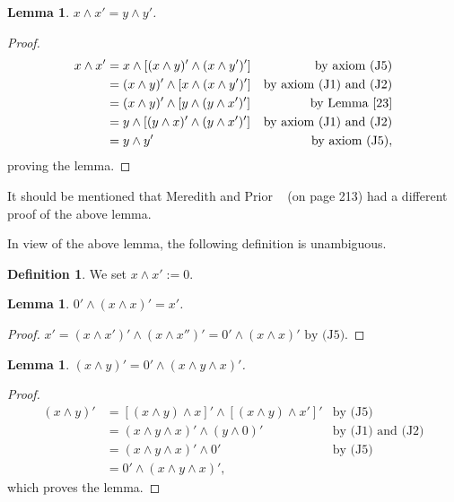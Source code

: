 \documentclass{amsart}
\theoremstyle{plain}
\newtheorem{lemma}[theorem]{Lemma}
\theoremstyle{problem}
\theoremstyle{definition}
\newtheorem{definition}[theorem]{Definition}
\theoremstyle{remark}
\numberwithin{equation}{section}
\begin{document}
\begin{lemma} \label{24} 
    $x \land x' = y \land y'$.
\end{lemma}
\begin{proof}
\begin{align*}
               x \land x' 
               &= x \land [(x \land y)' \land (x \land y')']  &\text{by axiom (J5)}\\
              &= (x \land y)' \land [x \land (x \land y')'] &\text{by axiom (J1) and (J2)}\\
             &= (x \land y)' \land  [y \land (y \land x')'] &\text{by Lemma \ref{23}}\\
            &= y \land [(y \land x)' \land (y \land x')'] &\text{by axiom (J1) and (J2)}\\
           &= y \land y' &\text{by axiom (J5)},
\end{align*}
proving the lemma.
\end{proof}

    It should be mentioned that Meredith and Prior ~\cite{cM68} (on page 213) had a different proof of the above lemma.


In view of the above lemma, the following definition is unambiguous.
\begin{definition} \label{25} 
    We set $x \land x' := 0$.
\end{definition}


\begin{lemma} \label{28} 
    $0' \land (x \land x)'=x'$.
\end{lemma}
\begin{proof}
  $x' = (x \land x')' \land (x \land x'')'= 0' \land (x \land x)' \text{ by (J5)}$.
\end{proof}


\begin{lemma} \label{210} 
    $(x \land y)' = 0' \land (x \land y \land x)'$.
\end{lemma}
\begin{proof}
\begin{align*}
    (x \land y)' &= [(x \land y) \land x]' \land [(x \land y) \land x']' &\text{by (J5)}\\
                 &= (x \land y \land x)' \land (y \land 0)'  &\text{by (J1) and (J2)}\\         
                 &= (x \land y \land x)' \land 0' &\text{by (J5)}\\
                 &= 0' \land (x \land y \land x)',
\end{align*}
which proves the lemma.
\end{proof}
\end{document}
